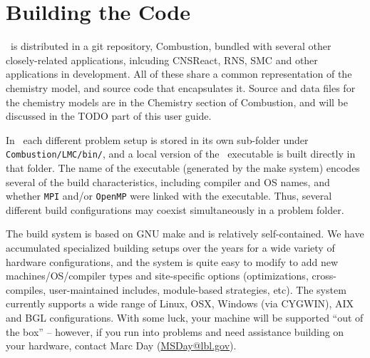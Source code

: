 
\section{Building the Code}

\lmc\ is distributed in a git repository, {\sf Combustion}, bundled with several other closely-related
applications, inlcuding {\sf CNSReact}, {\sf RNS}, {\sf SMC} and other applications in development.  All
of these share a common representation of the chemistry model, and source code that
encapsulates it.  Source and data files for the chemistry models are in the 
{\sf Chemistry} section of {\sf Combustion}, and will be discussed in the TODO part of this user guide.  

In \lmc\ each different problem setup is stored in its own
sub-folder under {\tt Combustion/LMC/bin/}, and a local version of the 
\lmc\ executable is built directly in that folder.  The name of the executable (generated by the make
system) encodes several of the build characteristics, including 
compiler and OS names, and whether {\tt MPI} and/or {\tt OpenMP} were linked with the executable.
Thus, several different build configurations may coexist simultaneously in a problem folder.

The build system is based on GNU make and is relatively self-contained.  We have accumulated 
specialized building setups over the years for a wide variety of hardware configurations, and 
the system is quite easy to modify to add new machines/OS/compiler types and site-specific 
options (optimizations, cross-compiles, user-maintained includes, module-based strategies, etc).
The system currently supports a wide range of Linux, OSX, Windows (via CYGWIN), AIX and BGL 
configurations. With some luck, your machine will be supported ``out of the box'' -- however, if 
you run into problems and need assistance building on your hardware, contact Marc Day (\url{MSDay@lbl.gov}).


